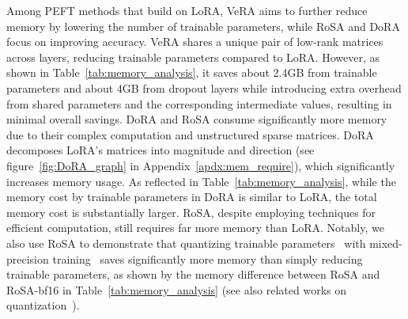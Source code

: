 Among PEFT methods that build on LoRA, VeRA aims to further reduce memory by lowering the number of trainable parameters, while RoSA and DoRA focus on improving accuracy. VeRA shares a unique pair of low-rank matrices across layers, reducing trainable parameters compared to LoRA. However, as shown in Table~\ref{tab:memory_analysis}, it saves about 2.4GB from trainable parameters and about 4GB from dropout layers while introducing extra overhead from shared parameters and the corresponding intermediate values, resulting in minimal overall savings. DoRA and RoSA consume significantly more memory due to their complex computation and unstructured sparse matrices. DoRA decomposes LoRA’s matrices into magnitude and direction (see figure~\ref{fig:DoRA_graph} in Appendix~\ref{apdx:mem_require}), which significantly increases memory usage. As reflected in Table~\ref{tab:memory_analysis}, while the memory cost by trainable parameters in DoRA is similar to LoRA, the total memory cost is substantially larger. RoSA, despite employing techniques for efficient computation, still requires far more memory than LoRA. Notably, we also use RoSA to demonstrate that quantizing trainable parameters~\citep{gholami2022survey, dettmers2022gpt3, dettmers2024qlora} with mixed-precision training~\citep{micikevicius2018mixed} saves significantly more memory than simply reducing trainable parameters, as shown by the memory difference between RoSA and RoSA-bf16 in Table~\ref{tab:memory_analysis} (see also related works on quantization~\citep{dettmers2022gpt3,guo2024lqlora,li2024loftq,dettmers2024qlora}).

